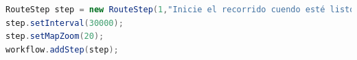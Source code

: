 \begin{lstlisting}[language=Java, frame=tlbr, caption=RouteStep en Java.]	
RouteStep step = new RouteStep(1,"Inicie el recorrido cuendo esté listo",2);
step.setInterval(30000);
step.setMapZoom(20);
workflow.addStep(step);
\end{lstlisting}



